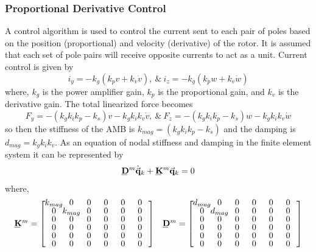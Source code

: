 \subsubsection{Proportional Derivative Control}
A control algorithm is used to control the current sent to each pair of poles based on the position (proportional) and velocity (derivative) of the rotor. It is assumed that each set of pole pairs will receive opposite currents to act as a unit. Current control is given by 
\begin{equation}\label{eq:ControlCurrent}
i_y=-k_g(k_pv+k_v\dot{v}),\ \&\ i_z=-k_g(k_pw+k_v\dot{w})
\end{equation}
where, $ k_g $ is the power amplifier gain, $ k_p $ is the proportional gain, and $ k_v $ is the derivative gain. The total linearized force becomes
\begin{equation}\label{key}
F_y=-(k_gk_ik_p-k_s)v-k_gk_ik_v\dot{v},\ \&\ F_z=-(k_gk_ik_p-k_s)w-k_gk_ik_v\dot{w}
\end{equation}
so then the stiffness of the AMB is $ k_{mag}=(k_gk_ik_p-k_s) $ and the damping is $ d_{mag}=k_gk_ik_v $. As an equation of nodal stiffness and damping in the finite element system it can be represented by
\begin{equation}\label{eq:DiskNodeEquationofMotion}
\bunderline{\mathbf{D}}^m\dot{\vec{\mathbf{q}}}_k+\bunderline{\mathbf{K}}^m\vec{\mathbf{q}}_k=0
\end{equation}
where,
\begin{equation*}
\def\cs{2em}
\begin{array}{cc}
\bunderline{\mathbf{K}}^m=\left[\def\arraystretch{.8}\arraycolsep=0pt\begin{array}{cccccc}
\makebox[\cs]{$k_{mag}$}&\makebox[\cs]{0}&\makebox[\cs]{0}&\makebox[\cs]{0}&\makebox[\cs]{0}&\makebox[\cs]{0}\\
0&k_{mag}&0&0&0&0\\
0&0&0&0&0&0\\
0&0&0&0&0&0\\
0&0&0&0&0&0\\
0&0&0&0&0&0
\end{array}\right] & \bunderline{\mathbf{D}}^m=\left[\def\arraystretch{.8}\arraycolsep=0pt\begin{array}{cccccc}
\makebox[\cs]{$d_{mag}$}&\makebox[\cs]{0}&\makebox[\cs]{0}&\makebox[\cs]{0}&\makebox[\cs]{0}&\makebox[\cs]{0}\\
0&d_{mag}&0&0&0&0\\
0&0&0&0&0&0\\
0&0&0&0&0&0\\
0&0&0&0&0&0\\
0&0&0&0&0&0
\end{array}\right]
\end{array}
\end{equation*}
